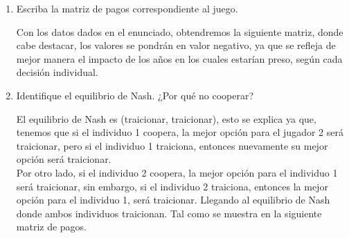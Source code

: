 \documentclass{exam}
\begin{document}
  \begin{enumerate}[label=(\alph*), ref=\alph*]
    \item Escriba la matriz de pagos correspondiente al juego.
    \begin{solution}
    Con los datos dados en el enunciado, obtendremos la siguiente matriz, donde cabe destacar, los valores se pondrán en valor negativo, ya que se refleja de mejor manera el impacto de los años en los cuales estarían preso, según cada decisión individual. 
    


\begin{center}

    
\end{center}



    \end{solution}
    
    \item Identifique el equilibrio de Nash. ¿Por qué no cooperar?
    \begin{solution}
    El equilibrio de Nash es (traicionar, traicionar), esto se explica ya que, tenemos que si el individuo 1 coopera, la mejor opción para el jugador 2 será traicionar, pero si el individuo 1 traiciona, entonces nuevamente su mejor opción será traicionar.\\
    
    Por otro lado, si el individuo 2 coopera, la mejor opción para el individuo 1 será traicionar, sin embargo, si el individuo 2 traiciona, entonces la mejor opción para el individuo 1, será traicionar. Llegando al equilibrio de Nash donde ambos individuos traicionan. 
    Tal como se muestra en la siguiente matriz de pagos.
  

\end{solution}
\end{enumerate}
\end{document}
